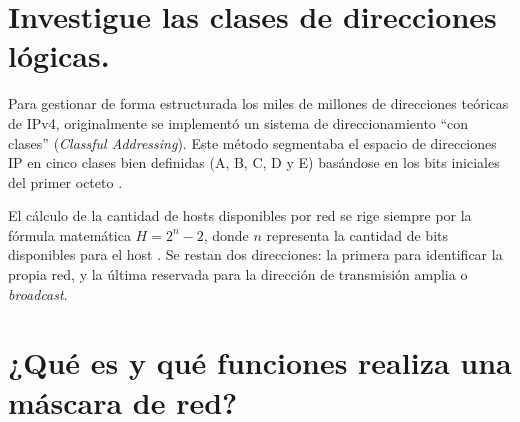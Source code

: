 \documentclass[a4paper,12pt]{article}
\begin{document}
\section{Investigue las clases de direcciones lógicas.}

Para gestionar de forma estructurada los miles de millones de direcciones teóricas de IPv4, originalmente se implementó un sistema de direccionamiento ``con clases'' (\textit{Classful Addressing}). Este método segmentaba el espacio de direcciones IP en cinco clases bien definidas (A, B, C, D y E) basándose en los bits iniciales del primer octeto \cite{ref12}.

\begin{table}[H]
\centering
{}
\end{table}

El cálculo de la cantidad de hosts disponibles por red se rige siempre por la fórmula matemática $H = 2^n - 2$, donde $n$ representa la cantidad de bits disponibles para el host \cite{ref13}. Se restan dos direcciones: la primera para identificar la propia red, y la última reservada para la dirección de transmisión amplia o \textit{broadcast}.

\section{¿Qué es y qué funciones realiza una máscara de red?}
\end{document}
